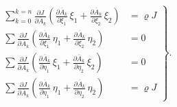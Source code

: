 \documentclass[11pt]{article}
\providecommand{\weberpage}[1]{}
\providecommand{\weq}[2]{\begin{equation}\tag{#1}#2\end{equation}}
\begin{document}
\weberpage{121}
\weq{II}{
\left.\begin{aligned}
\sum_{k=0}^{k=n} \frac{\partial J}{\partial \overline{A}_k}\left(\frac{\partial \overline{A}_k}{\partial \xi_1}\,\xi_1 + \frac{\partial \overline{A}_k}{\partial \xi_2}\,\xi_2\right) &= \varrho J\\
\sum \frac{\partial J}{\partial \overline{A}_k}\left(\frac{\partial \overline{A}_k}{\partial \xi_1}\,\eta_1 + \frac{\partial \overline{A}_k}{\partial \xi_2}\,\eta_2\right) &= 0\\
\sum \frac{\partial J}{\partial \overline{A}_k}\left(\frac{\partial \overline{A}_k}{\partial \eta_1}\,\xi_1 + \frac{\partial \overline{A}_k}{\partial \eta_2}\,\xi_2\right) &= 0\\
\sum \frac{\partial J}{\partial \overline{A}_k}\left(\frac{\partial \overline{A}_k}{\partial \eta_1}\,\eta_1 + \frac{\partial \overline{A}_k}{\partial \eta_2}\,\eta_2\right) &= \varrho J
\end{aligned}\right\}.
}
\end{document}
